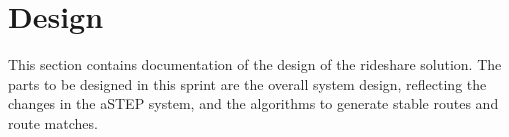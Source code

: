 \section{Design}

This section contains documentation of the design of the rideshare solution.
The parts to be designed in this sprint are the overall system design, reflecting the changes in the aSTEP system, and the algorithms to generate stable routes and route matches.





